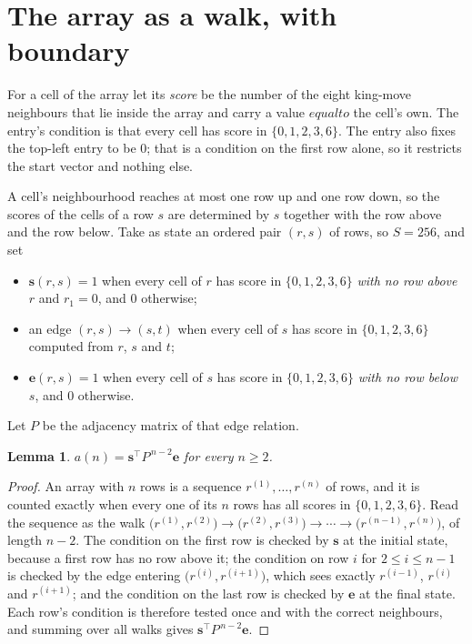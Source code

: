 \documentclass[11pt,a4paper]{article}
\theoremstyle{plain}
\newtheorem{lemma}[theorem]{Lemma}
\theoremstyle{definition}
\begin{document}
\section{The array as a walk, with boundary}

For a cell of the array let its \emph{score} be the number of the eight king-move neighbours that lie inside
the array and carry a value $equal to$ the cell's own. The entry's condition is that every cell
has score in $\{0,1,2,3,6\}$. The entry also fixes the top-left entry to be $0$; that is a condition on the first row alone, so it restricts the start vector and nothing else.

A cell's neighbourhood reaches at most one row up and one row down, so the scores of the
cells of a row $s$ are determined by $s$ together with the row above and the row below.
Take as state an ordered pair $(r,s)$ of rows, so $S=256$, and set
\begin{itemize}
\item $\mathbf{s}(r,s)=1$ when every cell of $r$ has score in $\{0,1,2,3,6\}$ \emph{with no row
above $r$} and $r_1=0$, and $0$ otherwise;
\item an edge $(r,s)\to(s,t)$ when every cell of $s$ has score in $\{0,1,2,3,6\}$ computed from
$r$, $s$ and $t$;
\item $\mathbf{e}(r,s)=1$ when every cell of $s$ has score in $\{0,1,2,3,6\}$ \emph{with no row
below $s$}, and $0$ otherwise.
\end{itemize}
Let $P$ be the adjacency matrix of that edge relation.

\begin{lemma}\label{lem:walk}
$a(n)=\mathbf{s}^{\!\top}P^{\,n-2}\mathbf{e}$ for every $n\ge2$.
\end{lemma}

\begin{proof}
An array with $n$ rows is a sequence $r^{(1)},\dots,r^{(n)}$ of rows, and it is counted
exactly when every one of its $n$ rows has all scores in $\{0,1,2,3,6\}$. Read the sequence as the
walk $\bigl(r^{(1)},r^{(2)}\bigr)\to\bigl(r^{(2)},r^{(3)}\bigr)\to\cdots\to
\bigl(r^{(n-1)},r^{(n)}\bigr)$, of length $n-2$. The condition on the first row is
checked by $\mathbf{s}$ at the initial state, because a first row has no row above it; the
condition on row $i$ for $2\le i\le n-1$ is checked by the edge entering
$\bigl(r^{(i)},r^{(i+1)}\bigr)$, which sees exactly $r^{(i-1)}$, $r^{(i)}$ and
$r^{(i+1)}$; and the condition on the last row is checked by $\mathbf{e}$ at the final
state. Each row's condition is therefore tested once and with the correct neighbours, and
summing over all walks gives $\mathbf{s}^{\!\top}P^{\,n-2}\mathbf{e}$.
\end{proof}
\end{document}
